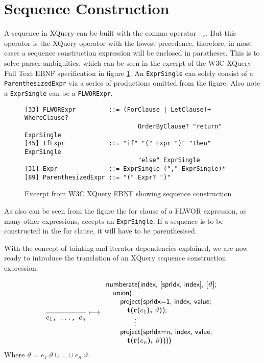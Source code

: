 \section{Sequence Construction}
\label{sect:trans:TD:seqBuild}

A sequence in XQuery can be built with the comma operator --\texttt{,}. But this operator is the XQuery operator
with the lowest precedence, therefore, in most cases a sequence construction expression will be enclosed in
paratheses. This is to solve parser ambiguities, which can be seen in the
excerpt of the W3C XQuery Full Text EBNF specification\cite{w3c01} in figure \ref{fig:trans:TD:seqEBNF}. An \texttt{ExprSingle} can solely consist of a
\texttt{ParenthesizedExpr} via a series of productions omitted from the figure. Also note a \texttt{ExprSingle}
can be a \texttt{FLWORExpr}.

\begin{figure}[h]
\begin{Verbatim}
[33] FLWORExpr         ::= (ForClause | LetClause)+ WhereClause? 
                               OrderByClause? "return" ExprSingle
[45] IfExpr            ::= "if" "(" Expr ")" "then" ExprSingle 
                               "else" ExprSingle
[31] Expr              ::= ExprSingle ("," ExprSingle)*
[89] ParenthesizedExpr ::= "(" Expr? ")"
\end{Verbatim}
\caption[Excerpt from W3C XQuery EBNF]{Excerpt from W3C XQuery EBNF showing
sequence construction}
\label{fig:trans:TD:seqEBNF}
\end{figure}

As also can be seen from the figure the for clause of a FLWOR expression, as many other expressions, accepts an
\texttt{ExprSingle}. If a sequence is to be constructed in the for clause, it will have to be parenthesised. 

With the concept of tainting and iterator dependencies explained, we are now ready to introduce the translation of
an XQuery sequence construction expression:

\begin{equation}
\frac{}{e_{1}\mbox{\texttt{, \ldots, }}e_{n}}\longmapsto
\begin{array}{l}
\mbox{\textsf{numberate(index, [sprIdx, index], [}}\vartheta\mbox{\textsf{];}} \\ \quad
\mbox{\textsf{union(}} \\ \quad \quad
\mbox{\textsf{project(sprIdx=1, index, value; }} \\ \quad \quad \quad
\mbox{\textbf{t(r(}}e_{1}\mbox{\textbf{), }}\vartheta\mbox{\textbf{)}\textsf{);}} \\ \quad \quad
\qquad\vdots\\ \quad \quad
\mbox{\textsf{project(sprIdx=}\textit{n}\textsf{, index, value; }} \\ \quad \quad \quad
\mbox{\textbf{t(r(}}e_{n}\mbox{\textbf{), }}\vartheta\mbox{\textbf{)}\textsf{)))}}
\end{array}
\label{rule:trans:TD:seqConstr}
\end{equation}
Where $\vartheta=e_{1}.\vartheta \cup \ldots \cup e_{n}.\vartheta$.

